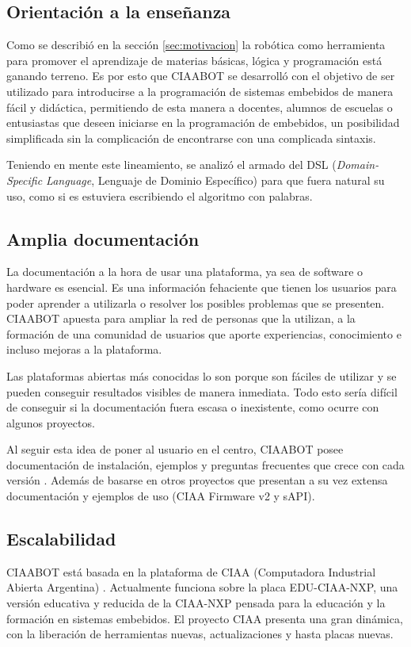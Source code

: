 \subsection{Orientación a la enseñanza}
\label{subsec:orientacion}
Como se describió en la sección \ref{sec:motivacion} la robótica como herramienta para promover el aprendizaje de materias básicas, lógica y programación está ganando terreno. Es por esto que CIAABOT se desarrolló con el objetivo de ser utilizado para introducirse a la programación de sistemas embebidos de manera fácil y didáctica, permitiendo de esta manera a docentes, alumnos de escuelas o entusiastas que deseen iniciarse en la programación de embebidos, un posibilidad simplificada sin la complicación de encontrarse con una complicada sintaxis.

Teniendo en mente este lineamiento, se analizó el armado del DSL (\emph{Domain-Specific Language}, Lenguaje de Dominio Específico) para que fuera natural su uso, como si es estuviera escribiendo el algoritmo con palabras. 

\subsection{Amplia documentación}
\label{subsec:ampliaDoc}
La documentación a la hora de usar una plataforma, ya sea de software o hardware es esencial. Es una información fehaciente que tienen los usuarios para poder aprender a utilizarla o resolver los posibles problemas que se presenten. CIAABOT apuesta para ampliar la red de personas que la utilizan, a la formación de una comunidad de usuarios que aporte experiencias, conocimiento e incluso mejoras a la plataforma.

Las plataformas abiertas más conocidas lo son porque son fáciles de utilizar y se pueden conseguir resultados visibles de manera inmediata. Todo esto sería difícil de conseguir si la documentación fuera escasa o inexistente, como ocurre con algunos proyectos.

Al seguir esta idea de poner al usuario en el centro, CIAABOT posee documentación de instalación, ejemplos y preguntas frecuentes que crece con cada versión \citep{CIAABOT:documentacion}. Además de basarse en otros proyectos que presentan a su vez extensa documentación y ejemplos de uso (CIAA Firmware v2 y sAPI).

\subsection{Escalabilidad}
\label{subsec:escalabilidad}
CIAABOT está basada en la plataforma de CIAA (Computadora Industrial Abierta Argentina) \citep{CIAA}. Actualmente funciona sobre la placa EDU-CIAA-NXP, una versión educativa y reducida de la CIAA-NXP pensada para la educación y la formación en sistemas embebidos. El proyecto CIAA presenta una gran dinámica, con la liberación de herramientas nuevas, actualizaciones y hasta placas nuevas. 

